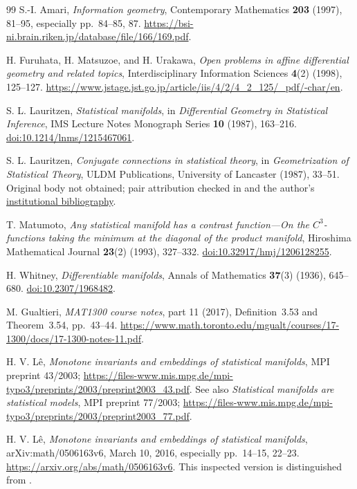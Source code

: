 \documentclass[10pt,letterpaper]{article}
\begin{document}
\begin{thebibliography}{99}\small
{}
S.-I. Amari, \emph{Information geometry}, Contemporary Mathematics
\textbf{203} (1997), 81--95, especially pp.~84--85, 87.
\url{https://bsi-ni.brain.riken.jp/database/file/166/169.pdf}.

H. Furuhata, H. Matsuzoe, and H. Urakawa,
\emph{Open problems in affine differential geometry and related topics},
Interdisciplinary Information Sciences \textbf{4}(2) (1998), 125--127.
\url{https://www.jstage.jst.go.jp/article/iis/4/2/4_2_125/_pdf/-char/en}.

S. L. Lauritzen, \emph{Statistical manifolds}, in
\emph{Differential Geometry in Statistical Inference}, IMS Lecture Notes
Monograph Series \textbf{10} (1987), 163--216.
\href{https://doi.org/10.1214/lnms/1215467061}{doi:10.1214/lnms/1215467061}.

S. L. Lauritzen, \emph{Conjugate connections in statistical theory},
in \emph{Geometrization of Statistical Theory}, ULDM Publications,
University of Lancaster (1987), 33--51. Original body not obtained;
pair attribution checked in \cite[\S2.4]{Marugame} and the author's
\href{https://web.math.ku.dk/~lauritzen/publications.html}{institutional bibliography}.

T. Matumoto, \emph{Any statistical manifold has a contrast function---On
the $C^3$-functions taking the minimum at the diagonal of the product
manifold}, Hiroshima Mathematical Journal \textbf{23}(2) (1993), 327--332.
\href{https://doi.org/10.32917/hmj/1206128255}{doi:10.32917/hmj/1206128255}.

H. Whitney, \emph{Differentiable manifolds}, Annals of Mathematics
\textbf{37}(3) (1936), 645--680.
\href{https://doi.org/10.2307/1968482}{doi:10.2307/1968482}.

M. Gualtieri, \emph{MAT1300 course notes}, part 11 (2017),
Definition~3.53 and Theorem~3.54, pp.~43--44.
\url{https://www.math.toronto.edu/mgualt/courses/17-1300/docs/17-1300-notes-11.pdf}.

H. V. L\^e, \emph{Monotone invariants and embeddings of statistical
manifolds}, MPI preprint 43/2003;
\url{https://files-www.mis.mpg.de/mpi-typo3/preprints/2003/preprint2003_43.pdf}.
See also \emph{Statistical manifolds are statistical models}, MPI preprint
77/2003;
\url{https://files-www.mis.mpg.de/mpi-typo3/preprints/2003/preprint2003_77.pdf}.

H. V. L\^e, \emph{Monotone invariants and embeddings of statistical
manifolds}, arXiv:math/0506163v6, March 10, 2016, especially pp.~14--15,
22--23. \url{https://arxiv.org/abs/math/0506163v6}.
This inspected version is distinguished from \cite{Le2007}.


\end{thebibliography}
\end{document}
